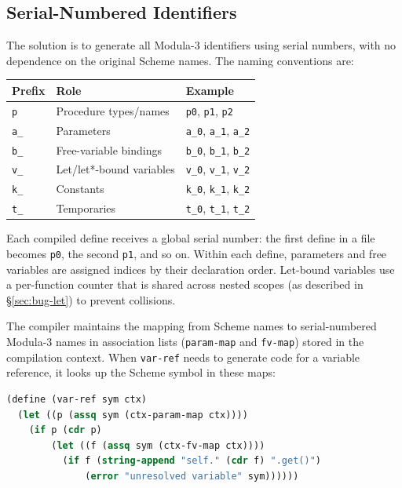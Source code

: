 \documentclass[12pt]{report}
\begin{document}
\subsection{Serial-Numbered Identifiers}

The solution is to generate all Modula-3 identifiers using serial
numbers, with no dependence on the original Scheme names.  The
naming conventions are:

\begin{center}
\begin{tabular}{lll}
\toprule
\textbf{Prefix} & \textbf{Role} & \textbf{Example} \\
\midrule
\texttt{p}     & Procedure types/names & \texttt{p0}, \texttt{p1}, \texttt{p2} \\
\texttt{a\_}   & Parameters            & \texttt{a\_0}, \texttt{a\_1}, \texttt{a\_2} \\
\texttt{b\_}   & Free-variable bindings & \texttt{b\_0}, \texttt{b\_1}, \texttt{b\_2} \\
\texttt{v\_}   & Let/let*-bound variables & \texttt{v\_0}, \texttt{v\_1}, \texttt{v\_2} \\
\texttt{k\_}   & Constants              & \texttt{k\_0}, \texttt{k\_1}, \texttt{k\_2} \\
\texttt{t\_}   & Temporaries            & \texttt{t\_0}, \texttt{t\_1}, \texttt{t\_2} \\
\bottomrule
\end{tabular}
\end{center}

Each compiled define receives a global serial number: the first
define in a file becomes \texttt{p0}, the second \texttt{p1}, and
so on.  Within each define, parameters and free variables are
assigned indices by their declaration order.  Let-bound variables
use a per-function counter that is shared across nested scopes (as
described in \S\ref{sec:bug-let}) to prevent collisions.

The compiler maintains the mapping from Scheme names to serial-numbered
Modula-3 names in association lists (\texttt{param-map} and
\texttt{fv-map}) stored in the compilation context.  When
\texttt{var-ref} needs to generate code for a variable reference,
it looks up the Scheme symbol in these maps:

\begin{lstlisting}[language=Scheme]
(define (var-ref sym ctx)
  (let ((p (assq sym (ctx-param-map ctx))))
    (if p (cdr p)
        (let ((f (assq sym (ctx-fv-map ctx))))
          (if f (string-append "self." (cdr f) ".get()")
              (error "unresolved variable" sym))))))
\end{lstlisting}
\end{document}
